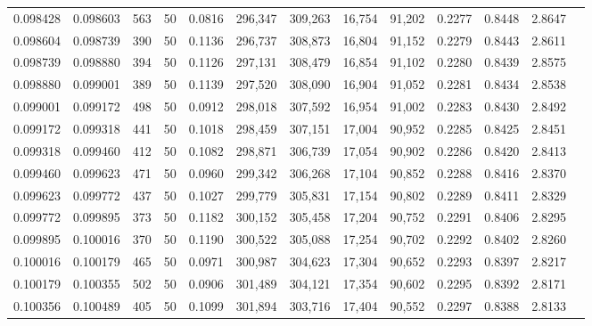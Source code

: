 \begin{tabular}{rrrrrrrrrrrrr}
0.098428 & 0.098603 &   563 &  50 &                                     0.0816 & 296,347 & 309,263 &  16,754 &  91,202 & 0.2277 & 0.8448 & 2.8647 \\
0.098604 & 0.098739 &   390 &  50 &                                     0.1136 & 296,737 & 308,873 &  16,804 &  91,152 & 0.2279 & 0.8443 & 2.8611 \\
0.098739 & 0.098880 &   394 &  50 &                                     0.1126 & 297,131 & 308,479 &  16,854 &  91,102 & 0.2280 & 0.8439 & 2.8575 \\
0.098880 & 0.099001 &   389 &  50 &                                     0.1139 & 297,520 & 308,090 &  16,904 &  91,052 & 0.2281 & 0.8434 & 2.8538 \\
0.099001 & 0.099172 &   498 &  50 &                                     0.0912 & 298,018 & 307,592 &  16,954 &  91,002 & 0.2283 & 0.8430 & 2.8492 \\
0.099172 & 0.099318 &   441 &  50 &                                     0.1018 & 298,459 & 307,151 &  17,004 &  90,952 & 0.2285 & 0.8425 & 2.8451 \\
0.099318 & 0.099460 &   412 &  50 &                                     0.1082 & 298,871 & 306,739 &  17,054 &  90,902 & 0.2286 & 0.8420 & 2.8413 \\
0.099460 & 0.099623 &   471 &  50 &                                     0.0960 & 299,342 & 306,268 &  17,104 &  90,852 & 0.2288 & 0.8416 & 2.8370 \\
0.099623 & 0.099772 &   437 &  50 &                                     0.1027 & 299,779 & 305,831 &  17,154 &  90,802 & 0.2289 & 0.8411 & 2.8329 \\
0.099772 & 0.099895 &   373 &  50 &                                     0.1182 & 300,152 & 305,458 &  17,204 &  90,752 & 0.2291 & 0.8406 & 2.8295 \\
0.099895 & 0.100016 &   370 &  50 &                                     0.1190 & 300,522 & 305,088 &  17,254 &  90,702 & 0.2292 & 0.8402 & 2.8260 \\
0.100016 & 0.100179 &   465 &  50 &                                     0.0971 & 300,987 & 304,623 &  17,304 &  90,652 & 0.2293 & 0.8397 & 2.8217 \\
0.100179 & 0.100355 &   502 &  50 &                                     0.0906 & 301,489 & 304,121 &  17,354 &  90,602 & 0.2295 & 0.8392 & 2.8171 \\
0.100356 & 0.100489 &   405 &  50 &                                     0.1099 & 301,894 & 303,716 &  17,404 &  90,552 & 0.2297 & 0.8388 & 2.8133 \\

\end{tabular}
